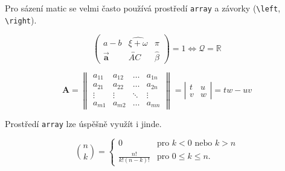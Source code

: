\documentclass[11pt,a4paper,twocolumn]{article}
\theoremstyle{definition}
\begin{document}
    Pro sázení matic se velmi často používá prostředí \verb|array|
    a závorky (\verb|\left|, \verb|\right|).
    
    $$
        \left(
        \begin{array}{ccc}
             a - b & \widehat{\xi + \omega} & \pi \\
            \Vec{\mathbf{a}} & \overleftrightarrow{AC} & \hat{\beta}
        \end{array}
        \right) = 1 \iff \mathcal{Q} = \mathbb{R}
    $$
    
    $$
		\mathbf{A} =
		\left\|
		\begin{array}{cccc}
			a_{11} & a_{12} & \ldots & a_{1n} \\
			a_{21} & a_{22} & \ldots & a_{2n} \\
			\vdots & \vdots & \ddots & \vdots \\
			a_{m1} & a_{m2} & \ldots & a_{mn}
		\end{array}
		\right\| =
		    \left|
		    \begin{array}{rl}
		         t & u \\
		         v & w 
		    \end{array}
		    \right| = tw\!-\!uv
	$$
	
	Prostředí \verb|array| lze úspěšně využít i jinde.
	
	$$
		\binom{n}{k} =
		\left\{
		\begin{array}{cl}
			 0 & \text{pro } k < 0 \text{ nebo } k > n \\
			\frac{n!}{k! (n - k)!} & \text{pro } 0 \leq k \leq n.
		\end{array}
		\right.
	$$
\end{document}
